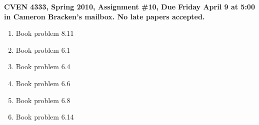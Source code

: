 \documentclass[11pt]{article}
\begin{document}
\textbf{CVEN 4333, Spring 2010, Assignment \#10, Due Friday April 9 at 5:00 in Cameron Bracken's mailbox. No late papers accepted.}

\begin{enumerate}

\item Book problem 8.11
\item Book problem 6.1
\item Book problem 6.4
\item Book problem 6.6
\item Book problem 6.8
\item Book problem 6.14

\end{enumerate}
\end{document}
